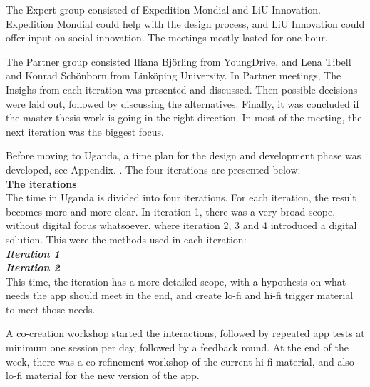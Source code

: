 The Expert group consisted of Expedition Mondial and LiU Innovation. Expedition Mondial could help with the design process, and LiU Innovation could offer input on social innovation. The meetings mostly lasted for one hour.

The Partner group consisted Iliana Björling from YoungDrive, and Lena Tibell and Konrad Schönborn from Linköping University. In Partner meetings, The Insighs from each iteration was presented and discussed. Then possible decisions were laid out, followed by discussing the alternatives. %
Finally, it was concluded if the master thesis work is going in the right direction. In most of the meeting, the next iteration was the biggest focus. %

Before moving to Uganda, a time plan for the design and development phase was developed, see Appendix. . The four iterations are presented below: \\

\textbf{The iterations} \\
The time in Uganda is divided into four iterations. For each iteration, the result becomes more and more clear. In iteration 1, there was a very broad scope, without digital focus whatsoever, where iteration 2, 3 and 4 introduced a digital solution. This were the methods used in each iteration:\\


\textit{\textbf{Iteration 1}}\\

   \textit{\textbf{Iteration 2}}\\
   This time, the iteration has a more detailed scope, with a hypothesis on what needs the app should meet in the end, and create lo-fi and hi-fi trigger material to meet those needs.

   A co-creation workshop started the interactions, followed by repeated app tests at minimum one session per day, followed by a feedback round. At the end of the week, there was a co-refinement workshop of the current hi-fi material, and also lo-fi material for the new version of the app.

